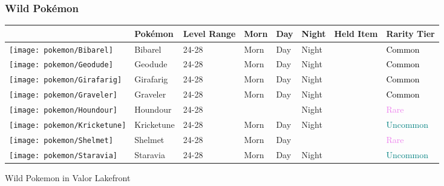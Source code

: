 \subsubsection{Wild Pokémon}%
\label{ssubsec:WildPokmon}%
\begin{longtable}{||l l l l l l l l||}%
\hline%
&Pokémon&Level Range&Morn&Day&Night&Held Item&Rarity Tier\\%
\hline%
\endhead%
\hline%
\texttt{[image: pokemon/Bibarel]}&Bibarel&24{-}28&Morn&Day&Night&&\textcolor{black}{%
Common%
}\\%
\hline%
\texttt{[image: pokemon/Geodude]}&Geodude&24{-}28&Morn&Day&Night&&\textcolor{black}{%
Common%
}\\%
\hline%
\texttt{[image: pokemon/Girafarig]}&Girafarig&24{-}28&Morn&Day&Night&&\textcolor{black}{%
Common%
}\\%
\hline%
\texttt{[image: pokemon/Graveler]}&Graveler&24{-}28&Morn&Day&Night&&\textcolor{black}{%
Common%
}\\%
\hline%
\texttt{[image: pokemon/Houndour]}&Houndour&24{-}28&&&Night&&\textcolor{violet}{%
Rare%
}\\%
\hline%
\texttt{[image: pokemon/Kricketune]}&Kricketune&24{-}28&Morn&Day&Night&&\textcolor{teal}{%
Uncommon%
}\\%
\hline%
\texttt{[image: pokemon/Shelmet]}&Shelmet&24{-}28&Morn&Day&&&\textcolor{violet}{%
Rare%
}\\%
\hline%
\texttt{[image: pokemon/Staravia]}&Staravia&24{-}28&Morn&Day&Night&&\textcolor{teal}{%
Uncommon%
}\\%
\hline%
\end{longtable}%
\caption{Wild Pokemon in Valor Lakefront}
